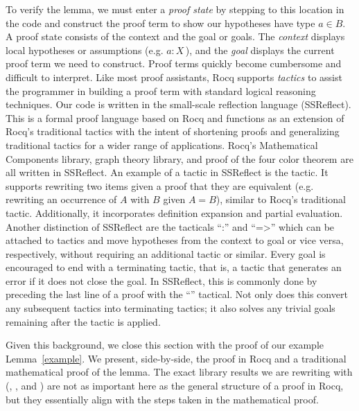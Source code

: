 To verify the lemma, we must enter a \textit{proof state} by stepping to this location in the code and construct the proof term to show our hypotheses have type $a \in B.$ A proof state consists of the context and the goal or goals. The \textit{context} displays local hypotheses or assumptions (e.g. $a : X\,$), and the \textit{goal} displays the current proof term we need to construct. Proof terms quickly become cumbersome and difficult to interpret. Like most proof assistants, Rocq supports \textit{tactics} to assist the programmer in building a proof term with standard logical reasoning techniques. Our code is written in the small-scale reflection language (SSReflect). This is a formal proof language based on Rocq and functions as an extension of Rocq's traditional tactics with the intent of shortening proofs and generalizing traditional tactics for a wider range of applications. Rocq's Mathematical Components library, graph theory library, and proof of the four color theorem are all written in SSReflect. An example of a tactic in SSReflect is the  tactic. It supports rewriting two items given a proof that they are equivalent (e.g. rewriting an occurrence of $A$ with $B$ given $A = B$), similar to Rocq's traditional  tactic. Additionally, it incorporates definition expansion and partial evaluation. Another distinction of SSReflect are the tacticals ``:'' and ``=>'' which can be attached to tactics and move hypotheses from the context to goal or vice versa, respectively, without requiring an additional  tactic or similar. Every goal is encouraged to end with a terminating tactic, that is, a tactic that generates an error if it does not close the goal. In SSReflect, this is commonly done by preceding the last line of a proof with the ``'' tactical. Not only does this convert any subsequent tactics into terminating tactics; it also solves any trivial goals remaining after the tactic is applied.

Given this background, we close this section with the proof of our example Lemma~\ref{example}. We present, side-by-side, the proof in Rocq and a traditional mathematical proof of the lemma. The exact library results we are rewriting with (, , and ) are not as important here as the general structure of a proof in Rocq, but they essentially align with the steps taken in the mathematical proof. 

